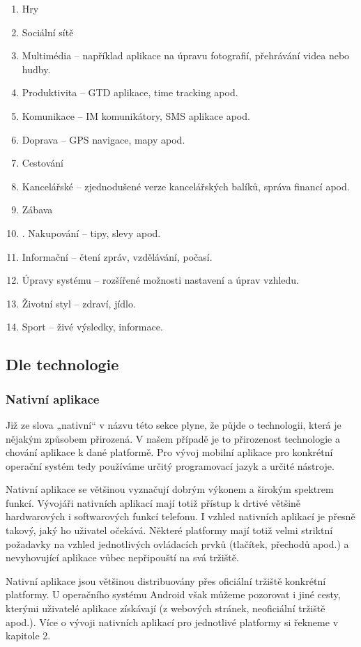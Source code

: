 \begin{enumerate}
	\item Hry
	\item Sociální sítě
	\item Multimédia – například aplikace na úpravu fotografií, přehrávání videa nebo hudby.
	\item Produktivita – GTD aplikace, time tracking apod.
	\item Komunikace – IM komunikátory, SMS aplikace apod.
	\item Doprava – GPS navigace, mapy apod.
	\item Cestování
	\item Kancelářské – zjednodušené verze kancelářských balíků, správa financí apod.
	\item Zábava
	\item. Nakupování – tipy, slevy apod.
	\item Informační – čtení zpráv, vzdělávání, počasí.
	\item Úpravy systému – rozšířené možnosti nastavení a úprav vzhledu.
	\item Životní styl – zdraví, jídlo.
	\item Sport – živé výsledky, informace.
\end{enumerate}

\subsection{Dle technologie}
\subsubsection{Nativní aplikace}
Již ze slova „nativní“ v názvu této sekce plyne, že půjde o technologii, která je nějakým způsobem přirozená. V našem případě je to přirozenost technologie a chování aplikace k dané platformě. Pro vývoj mobilní aplikace pro konkrétní operační systém tedy používáme určitý programovací jazyk a určité nástroje. 

Nativní aplikace se většinou vyznačují dobrým výkonem a širokým spektrem funkcí. Vývojáři nativních aplikací mají totiž přístup k drtivé většině hardwarových i softwarových funkcí telefonu. I vzhled nativních aplikací je přesně takový, jaký ho uživatel očekává. Některé platformy mají totiž velmi striktní požadavky na vzhled jednotlivých ovládacích prvků (tlačítek, přechodů apod.) a nevyhovující aplikace vůbec nepřipouští na svá tržiště.

Nativní aplikace jsou většinou distribuovány přes oficiální tržiště konkrétní platformy. U operačního systému Android však můžeme pozorovat i jiné cesty, kterými uživatelé aplikace získávají (z webových stránek, neoficiální tržiště apod.). Více o vývoji nativních aplikací pro jednotlivé platformy si řekneme v kapitole 2.

